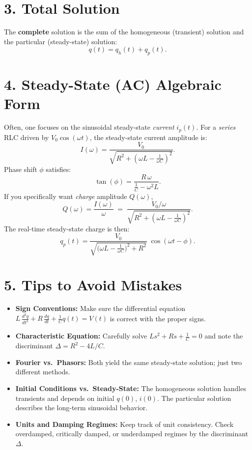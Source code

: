\documentclass{article}
\begin{document}
\vspace{1em}
\section*{3. Total Solution}

\noindent The \textbf{complete} solution is the sum of the homogeneous (transient) solution and the particular (steady-state) solution:
\[
q(t) = q_h(t) + q_p(t).
\]

\vspace{1em}
\section*{4. Steady-State (AC) Algebraic Form}

\noindent Often, one focuses on the sinusoidal steady-state \textit{current} $i_p(t)$. For a \textit{series} RLC driven by $V_0 \cos(\omega t)$, the steady-state current amplitude is:
\[
I(\omega) = \frac{V_0}{\sqrt{R^2 + \left(\omega L - \frac{1}{\omega C}\right)^2}}.
\]
Phase shift $\phi$ satisfies:
\[
\tan(\phi) = \frac{R\,\omega}{\tfrac{1}{C} - \omega^2 L}.
\]
If you specifically want \textit{charge} amplitude $Q(\omega)$,
\[
Q(\omega) = \frac{I(\omega)}{\omega} \;=\; \frac{V_0 / \omega}{\sqrt{R^2 + \left(\omega L - \frac{1}{\omega C}\right)^2}}.
\]
The real-time steady-state charge is then:
\[
q_p(t) = \frac{V_0}{\sqrt{\Big(\omega L - \frac{1}{\omega C}\Big)^2 + R^2}}\;\cos(\omega t - \phi).
\]

\vspace{1em}
\section*{5. Tips to Avoid Mistakes}
\begin{itemize}
\item \textbf{Sign Conventions:} Make sure the differential equation $L\,\tfrac{d^2 q}{dt^2} + R\,\tfrac{d q}{dt} + \tfrac{1}{C} q(t) = V(t)$ is correct with the proper signs.
\item \textbf{Characteristic Equation:} Carefully solve $L s^2 + R s + \tfrac{1}{C} = 0$ and note the discriminant $\Delta = R^2 - 4L/C$.
\item \textbf{Fourier vs.\ Phasors:} Both yield the same steady-state solution; just two different methods.
\item \textbf{Initial Conditions vs.\ Steady-State:} The homogeneous solution handles transients and depends on initial $q(0)$, $i(0)$. The particular solution describes the long-term sinusoidal behavior.
\item \textbf{Units and Damping Regimes:} Keep track of unit consistency. Check overdamped, critically damped, or underdamped regimes by the discriminant $\Delta$.
\end{itemize}
\end{document}
